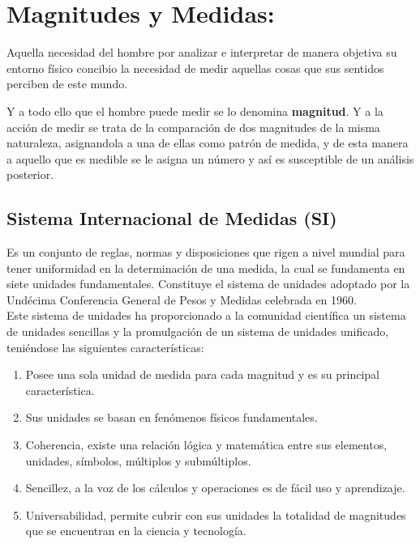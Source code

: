\documentclass[a5paper,pagesize,10pt,bibtotoc,pointlessnumbers,
normalheadings,DIV=9,fleqn,x11names,table,twoside=false]{scrbook}
\begin{document}
\section{Magnitudes y Medidas:}

Aquella necesidad del hombre por analizar e interpretar de manera objetiva su entorno físico concibio la necesidad de medir 
aquellas cosas que sus sentidos perciben de este mundo.

Y a todo ello que el hombre puede medir se lo denomina \textbf{magnitud}. Y a la acción de medir se trata de la comparación de dos 
magnitudes de la misma naturaleza, asignandola a una de ellas como patrón de medida, y de esta manera a aquello que es medible se 
le asigna un número y así es susceptible de un análisis posterior.

\subsection{Sistema Internacional de Medidas (SI)}

Es un conjunto de reglas, normas y disposiciones que rigen a nivel mundial para tener uniformidad en la determinación de una 
medida, la cual se fundamenta en siete unidades fundamentales. Constituye el sistema de unidades adoptado por la Undécima 
Conferencia General de Pesos y Medidas celebrada en 1960.\\ 

Este sistema de unidades ha proporcionado a la comunidad científica un sistema de unidades sencillas y la promulgación de un 
sistema de unidades unificado, teniéndose las siguientes características:

\begin{enumerate}

 \item Posee una sola unidad de medida para cada magnitud y es su principal característica.
 
 \item  Sus unidades se basan en fenómenos físicos fundamentales.

 \item Coherencia, existe una relación lógica y matemática entre sus elementos, unidades, símbolos, múltiplos y submúltiplos.
 
 \item Sencillez, a la voz de los cálculos y operaciones es de fácil uso y aprendizaje.
 
 \item Universabilidad, permite cubrir con sus unidades la totalidad de magnitudes que se encuentran en la ciencia y tecnología.
 
\end{enumerate}
\end{document}

